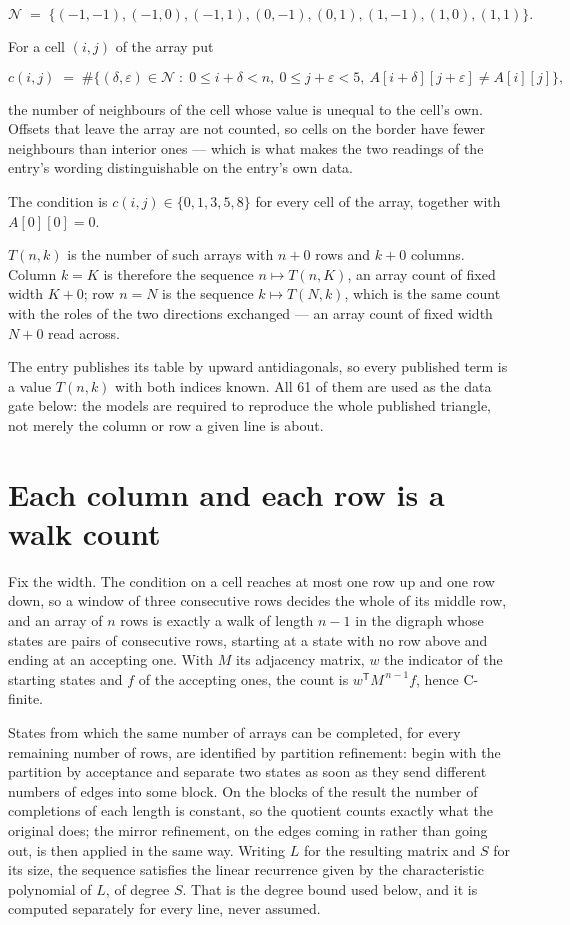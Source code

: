 \documentclass[11pt]{article}
\theoremstyle{definition}
\begin{document}
\[\mathcal{N} \;=\; \{(-1,-1), (-1,0), (-1,1), (0,-1), (0,1), (1,-1), (1,0), (1,1)\}.\]

For a cell $(i,j)$ of the array put

\[c(i,j) \;=\; \#\bigl\{(\delta,\varepsilon)\in\mathcal{N} \;:\; 0\le i+\delta<n,\ 0\le j+\varepsilon<5,\ A[i+\delta][j+\varepsilon] \neq A[i][j]\bigr\},\]

the number of neighbours of the cell whose value is unequal to the cell's own. Offsets that leave the array are not counted, so cells on the border have fewer neighbours than interior ones --- which is what makes the two readings of the entry's wording distinguishable on the entry's own data.

The condition is $c(i,j) \in \{0, 1, 3, 5, 8\}$ for every cell of the array, together with $A[0][0]=0$.

$T(n,k)$ is the number of such arrays with $n + 0$ rows and $k + 0$ columns. Column $k = K$ is therefore the sequence $n \mapsto T(n,K)$, an array count of fixed width $K + 0$; row $n = N$ is the sequence $k \mapsto T(N,k)$, which is the same count with the roles of the two directions exchanged --- an array count of fixed width $N + 0$ read across.

The entry publishes its table by upward antidiagonals, so every published term is a value $T(n,k)$ with both indices known. All 61 of them are used as the data gate below: the models are required to reproduce the whole published triangle, not merely the column or row a given line is about.

\section{Each column and each row is a walk count}

Fix the width. The condition on a cell reaches at most one row up and one row down, so a window of three consecutive rows decides the whole of its middle row, and an array of $n$ rows is exactly a walk of length $n-1$ in the digraph whose states are pairs of consecutive rows, starting at a state with no row above and ending at an accepting one. With $M$ its adjacency matrix, $w$ the indicator of the starting states and $f$ of the accepting ones, the count is $w^{\mathsf T}M^{\,n-1}f$, hence C-finite.

States from which the same number of arrays can be completed, for every remaining number of rows, are identified by partition refinement: begin with the partition by acceptance and separate two states as soon as they send different numbers of edges into some block. On the blocks of the result the number of completions of each length is constant, so the quotient counts exactly what the original does; the mirror refinement, on the edges coming in rather than going out, is then applied in the same way. Writing $L$ for the resulting matrix and $S$ for its size, the sequence satisfies the linear recurrence given by the characteristic polynomial of $L$, of degree $S$. That is the degree bound used below, and it is computed separately for every line, never assumed.
\end{document}
